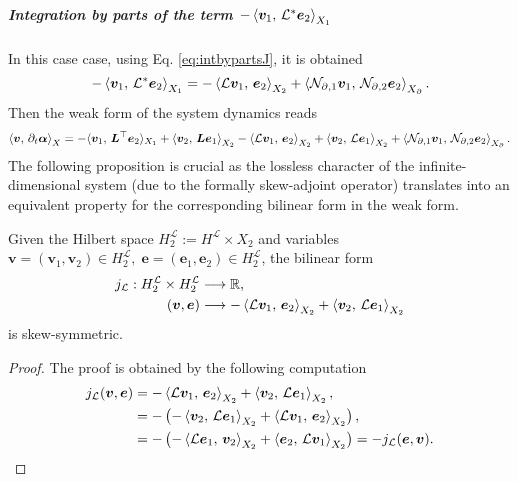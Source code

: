 \subparagraph{Integration by parts of the term $-\inner[X_1]{\bm{v}_1}{\mathcal{L}^*\bm{e}_2}$}
In this case case, using Eq. \eqref{eq:intbypartsJ}, it is obtained 
\begin{equation}
-\inner[X_1]{\bm{v}_1}{\mathcal{L}^*\bm{e}_2} = -\inner[X_2]{\mathcal{L}\bm{v}_1}{\bm{e}_2} + \inner[X_\partial]{\mathcal{N}_{\partial, 1} \bm{v}_1}{\mathcal{N}_{\partial, 2} \bm{e}_2}.
\end{equation}
Then the weak form of the system dynamics  reads 
\begin{equation}\label{eq:weak_dyn_intJ1}
\inner[X]{\bm{v}}{\partial_t \bm{\alpha}} =   -\langle{\bm{v}_1},\, {\bm{L}^\top \bm{e}_2}\rangle_{X_1} + \inner[X_2]{\bm{v}_2}{\bm{L}\bm{e}_1} -\inner[X_2]{\mathcal{L}\bm{v}_1}{\bm{e}_2} + \inner[X_2]{\bm{v}_2}{\mathcal{L}\bm{e}_1} + \inner[X_\partial]{\mathcal{N}_{\partial, 1} \bm{v}_1}{\mathcal{N}_{\partial, 2} \bm{e}_2}. 
\end{equation}
The following proposition is crucial as the lossless character of the infinite-dimensional system (due to the formally skew-adjoint operator) translates into an equivalent property for the corresponding bilinear form in the weak form.
\begin{proposition}
	Given the Hilbert space $H^{\mathcal{L}}_2 := H^\mathcal{L} \times X_2$ and variables $\bm{v} = (\bm{v}_1, \bm{v}_2) \in H^{\mathcal{L}}_2, \; \bm{e} = (\bm{e}_1, \bm{e}_2) \in H^{\mathcal{L}}_2$, the bilinear form 
	\begin{equation*}
	\begin{aligned}
	j_\mathcal{L}: H^{\mathcal{L}}_2 \times H^{\mathcal{L}}_2 &\longrightarrow \mathbb{R}, \\
	(\bm{v}, \bm{e}) &\longrightarrow -\inner[X_2]{\mathcal{L}\bm{v}_1}{\bm{e}_2} + \inner[X_2]{\bm{v}_2}{\mathcal{L}\bm{e}_1}
	\end{aligned}
	\end{equation*}
	is skew-symmetric.
	\begin{proof}
		The proof is obtained by the following computation
		\begin{equation*}
		\begin{aligned}
		j_\mathcal{L}(\bm{v}, \bm{e}) &= -\inner[X_2]{\mathcal{L}\bm{v}_1}{\bm{e}_2} + \inner[X_2]{\bm{v}_2}{\mathcal{L}\bm{e}_1}, \\
		&= - \left( - \inner[X_2]{\bm{v}_2}{\mathcal{L}\bm{e}_1} + \inner[X_2]{\mathcal{L}\bm{v}_1}{\bm{e}_2}\right), \\
		&= - \left( - \inner[X_2]{\mathcal{L}\bm{e}_1}{\bm{v}_2} + \inner[X_2]{\bm{e}_2}{\mathcal{L}\bm{v}_1}\right) = - j_\mathcal{L}(\bm{e}, \bm{v}).
		\end{aligned}
		\end{equation*}
	\end{proof}
\end{proposition}

